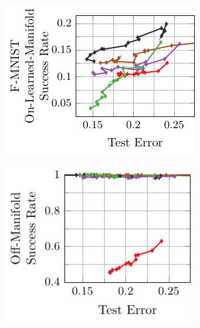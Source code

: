\begin{appendix}
\begin{figure}[t]
\begin{subfigure}{0.245\textwidth}
        \includegraphics[width=\textwidth]{appendix_mlp_fashion_error_on_learned.pdf}
    \end{subfigure}
    \begin{subfigure}{0.225\textwidth}
        \centering
        \includegraphics[width=0.925\textwidth]{appendix_mlp_fashion_error_off.pdf}
    \end{subfigure}
    \\
\end{figure}
\end{appendix}
